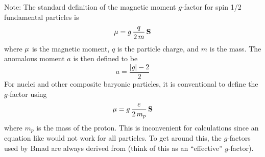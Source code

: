 {{{{{Note: The standard definition of the magnetic moment $g$-factor for spin 1/2 fundamental particles is
\begin{equation}
  {\bf \mu} = g \, \frac{q}{2 \, m} \, {\bf S}
  \label{mgq2m}
\end{equation}
where ${\bf \mu}$ is the magnetic moment, $q$ is the particle charge, and $m$ is the mass. The
anomalous moment $a$ is then defined to be
\begin{equation}
  a = \frac{|g| - 2}{2}
\end{equation}
For nuclei and other composite baryonic particles, it is conventional to define the $g$-factor using
\begin{equation}
  {\bf \mu} = g \, \frac{e}{2 \, m_p} \, {\bf S}
  \label{mgq2m2}
\end{equation}
where $m_p$ is the mass of the proton. This is inconvenient for calculations since an equation like
 would not work for all particles. To get around this, the $g$-factors used by Bmad are
always derived from  (think of this as an ``effective'' $g$-factor).

}}}}}
